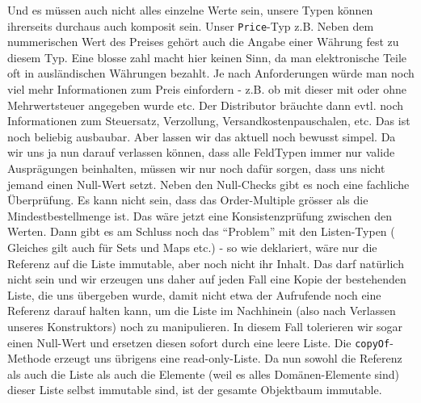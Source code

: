 Und es müssen auch nicht alles einzelne Werte sein, unsere Typen können 
ihrerseits durchaus auch komposit sein. Unser \texttt{Price}-Typ z.B.
Neben dem nummerischen Wert des Preises gehört auch die Angabe einer 
Währung fest zu diesem Typ. Eine blosse zahl macht hier keinen Sinn, da
man elektronische Teile oft in ausländischen Währungen bezahlt. 
Je nach Anforderungen würde man noch viel mehr Informationen
zum Preis einfordern - z.B. ob mit dieser mit oder ohne Mehrwertsteuer 
angegeben wurde etc. Der Distributor
bräuchte dann evtl. noch Informationen zum Steuersatz, Verzollung, 
Versandkostenpauschalen, etc. Das ist noch beliebig ausbaubar. 
Aber lassen wir das aktuell noch bewusst simpel. Da wir uns ja nun darauf 
verlassen können, dass alle FeldTypen
immer nur valide Ausprägungen beinhalten, müssen wir nur noch dafür sorgen, dass
uns nicht jemand einen Null-Wert setzt. Neben den Null-Checks gibt es noch
eine fachliche Überprüfung. Es kann nicht sein, dass das Order-Multiple grösser
als die Mindestbestellmenge ist. Das wäre jetzt eine Konsistenzprüfung zwischen
den Werten. Dann gibt es am Schluss noch das ``Problem'' mit den Listen-Typen (
Gleiches gilt auch für Sets und Maps etc.) - so wie deklariert, wäre nur die
Referenz auf die Liste immutable, aber noch nicht ihr Inhalt. Das darf natürlich 
nicht sein und wir erzeugen uns daher auf jeden Fall eine Kopie der bestehenden
Liste, die uns übergeben wurde, damit nicht etwa der Aufrufende noch eine 
Referenz darauf halten kann, um die Liste im Nachhinein 
(also nach Verlassen unseres Konstruktors) noch zu manipulieren. 
In diesem Fall tolerieren wir sogar einen Null-Wert und 
ersetzen diesen sofort durch eine leere Liste. Die \texttt{copyOf}-Methode
erzeugt uns übrigens eine read-only-Liste. Da nun sowohl die Referenz als auch die 
Liste als auch die Elemente (weil es alles Domänen-Elemente sind) dieser Liste 
selbst immutable sind, 
ist der gesamte Objektbaum immutable. 

